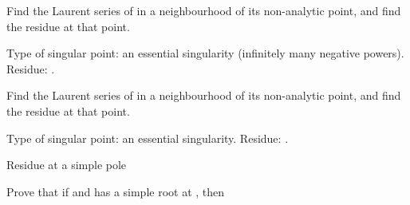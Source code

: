 \begin{EMunit}


\end{EMunit}

\begin{EMexample}{}

Find the Laurent series of  in a neighbourhood of its non-analytic point, and find the residue at that point.

Type of singular point: an essential singularity (infinitely many negative powers). Residue: .

\end{EMexample}

\begin{EMexample}{}

Find the Laurent series of  in a neighbourhood of its non-analytic point, and find the residue at that point.

Type of singular point: an essential singularity. Residue: .

\end{EMexample}

\begin{EMtheorem}{Residue at a simple pole}

Prove that if  and  has a simple root at , then

\end{EMtheorem}

